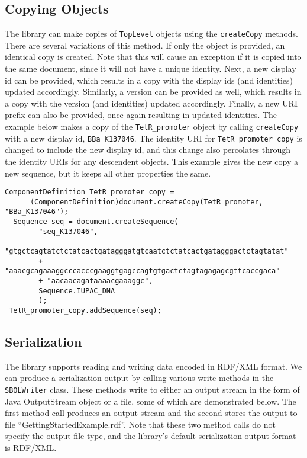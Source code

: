 \subsection*{Copying Objects}
The library can make copies of \lstinline+TopLevel+ objects using the \lstinline+createCopy+ methods.  There are several variations of this method.  If only the object is provided, an identical copy is created.  Note that this will cause an exception if it is copied into the same document, since it will not have a unique identity.  Next, a new display id can be provided, which results in a copy with the display ids (and identities) updated accordingly.  Similarly, a version can be provided as well, which results in a copy with the version (and identities) updated accordingly.  Finally, a new URI prefix can also be provided, once again resulting in updated identities.  The example below makes a copy of the
\lstinline+TetR_promoter+ object by calling \lstinline+createCopy+ with a new display id, \lstinline+BBa_K137046+. The identity URI for \lstinline+TetR_promoter_copy+ is changed to include the new display id, and this change also percolates through the identity URIs for any descendent objects.  This example gives the new copy a new sequence, but it keeps all other properties the same. 

\begin{minipage}{0.95\textwidth} 
\begin{lstlisting}[basicstyle=\footnotesize\ttfamily]
  ComponentDefinition TetR_promoter_copy = 
      (ComponentDefinition)document.createCopy(TetR_promoter, "BBa_K137046");
  Sequence seq = document.createSequence(
 		"seq_K137046",
		"gtgctcagtatctctatcactgatagggatgtcaatctctatcactgatagggactctagtatat"
		+ "aaacgcagaaaggcccacccgaaggtgagccagtgtgactctagtagagagcgttcaccgaca"
		+ "aacaacagataaaacgaaaggc",
		Sequence.IUPAC_DNA
		);	
 TetR_promoter_copy.addSequence(seq);
\end{lstlisting}
\end{minipage}

\subsection*{Serialization}
The library supports reading and writing data encoded in RDF/XML
format. We can produce a serialization output by
calling various write methods in the \lstinline+SBOLWriter+
class. These methods write to either an output stream in the form of
Java OutputStream object or a file, some
of which are demonstrated below. The first method call produces an output
stream and the second stores the output to file
``GettingStartedExample.rdf''. Note that these two method calls do not
specify the output file type, and the library's default serialization
output format is RDF/XML. %

